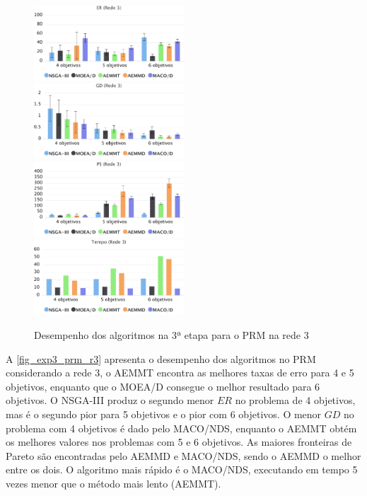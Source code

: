 \begin{figure}[!htbp]
	\includegraphics[width=0.5\textwidth]{cap_experimentos/figs/etapa3/er-mrp-r3}
	\includegraphics[width=0.5\textwidth]{cap_experimentos/figs/etapa3/gd-mrp-r3}
	\includegraphics[width=0.5\textwidth]{cap_experimentos/figs/etapa3/ps-mrp-r3}
	\includegraphics[width=0.5\textwidth]{cap_experimentos/figs/etapa3/time-mrp-r3}
	\caption{\label{fig_exp3_prm_r3}Desempenho dos algoritmos na 3ª etapa para o PRM na rede 3}
\end{figure}

A \autoref{fig_exp3_prm_r3} apresenta o desempenho dos algoritmos no PRM considerando a rede 3, o AEMMT encontra as melhores taxas de erro para 4 e 5 objetivos, enquanto que o MOEA/D consegue o melhor resultado para 6 objetivos. O NSGA-III produz o segundo menor $ER$ no problema de 4 objetivos, mas é o segundo pior para 5 objetivos e o pior com 6 objetivos. O menor $GD$ no problema com 4 objetivos é dado pelo MACO/NDS, enquanto o AEMMT obtém os melhores valores nos problemas com 5 e 6 objetivos. As maiores fronteiras de Pareto são encontradas pelo AEMMD e MACO/NDS, sendo o AEMMD o melhor entre os dois. O algoritmo mais rápido é o MACO/NDS, executando em tempo 5 vezes menor que o método mais lento (AEMMT).

